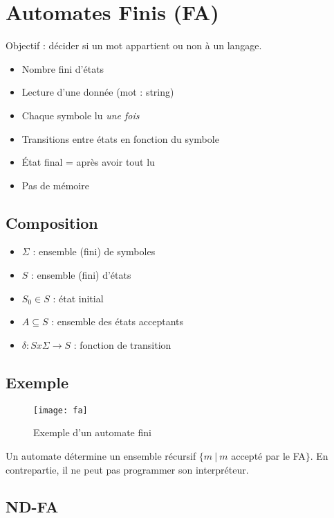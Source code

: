 \section{Automates Finis (FA)}

Objectif : décider si un mot appartient ou non à un langage.
\begin{itemize}
\item Nombre fini d'états
\item Lecture d'une donnée (mot : string)
\item Chaque symbole lu \textit{une fois}
\item Transitions entre états en fonction du symbole
\item État final = après avoir tout lu
\item Pas de mémoire
\end{itemize}

\subsection{Composition}

\begin{itemize}
\item $\Sigma$ : ensemble (fini) de symboles
\item $S$ : ensemble (fini) d'états
\item $S_0 \in S$ : état initial
\item $A \subseteq S$ : ensemble des états acceptants
\item $\delta : Sx\Sigma \rightarrow S$ : fonction de transition
\end{itemize}

\subsection{Exemple}

\begin{figure}[H]
    \centering
    \texttt{[image: fa]}
    \caption{Exemple d'un automate fini}
\end{figure}

Un automate détermine un ensemble récursif $\{m\ |\ m$ accepté par le FA$\}$. En contrepartie, il ne peut pas programmer son interpréteur.

\subsection{ND-FA}

